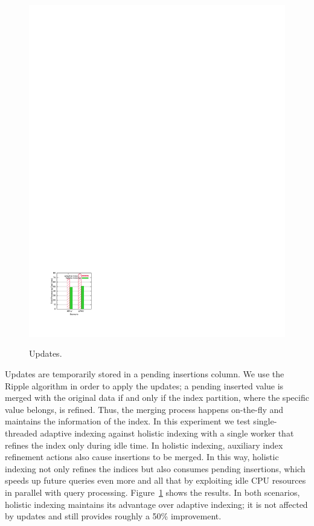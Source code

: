 \begin{figure}
\begin{center}
\includegraphics[trim=2.8cm 2cm 18cm 23.2cm]{Figures/holistic/updates}
\vspace{-0.1in}   %
\caption{Updates.}
\vspace{-0.3in}
\label{fig:updates}
\end{center}
\end{figure}
Updates are temporarily stored in a pending insertions column.
We use the Ripple algorithm \cite{DBLP:conf/sigmod/IdreosKM07} in order to apply the updates;
a pending inserted value is merged with the original data if and only if the index partition, where the specific value belongs, is refined.
Thus, the merging process happens on-the-fly and maintains the information of the index.
In this experiment we test single-threaded adaptive indexing against holistic indexing with a single worker that refines the index only during idle time.
In holistic indexing,  
auxiliary  index refinement actions also cause  insertions to be merged. In this way, holistic indexing not only refines the indices but also consumes pending
 insertions, which speeds up future queries even more and all that by exploiting idle CPU resources in parallel with query processing.
Figure~\ref{fig:updates} shows the results.
In both scenarios, holistic indexing maintains its advantage over adaptive indexing;
it is not affected by updates and still provides roughly a 50\% improvement.

